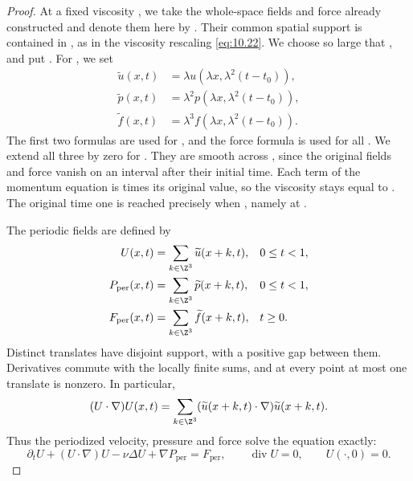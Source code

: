 \begin{proof}
At a fixed viscosity , we take the whole-space fields and force
already constructed and denote them here by . Their common
spatial support is contained in , as in the
viscosity rescaling \eqref{eq:10.22}. We choose  so large
that , and put
. For , we set
\[
\begin{aligned}
  \widetilde u(x,t)&=\lambda u(\lambda x,\lambda^2(t-t_0)),\\
  \widetilde p(x,t)&=\lambda^2p(\lambda x,\lambda^2(t-t_0)),\\
  \widetilde f(x,t)&=\lambda^3f(\lambda x,\lambda^2(t-t_0)).
\end{aligned}
\]
The first two formulas are used for , and the force formula is
used for all . We extend all three by zero for
. They are smooth across
, since the original fields and force vanish on an interval
after their initial time. Each term of the momentum equation is
 times its original value, so the viscosity stays equal
to . The original time one is reached precisely when
, namely at .

The periodic fields are defined by
\[
\begin{aligned}
  U(x,t)&=\sum_{k\in\Z^3}\widetilde u(x+k,t),&&0\leq t<1,\\
  P_{\mathrm{per}}(x,t)&=\sum_{k\in\Z^3}\widetilde p(x+k,t),&&0\leq t<1,\\
  F_{\mathrm{per}}(x,t)&=\sum_{k\in\Z^3}\widetilde f(x+k,t),&&t\geq0.
\end{aligned}
\]
Distinct translates have disjoint support, with a positive gap between them. Derivatives
commute with the locally finite sums, and at every point at most one translate is nonzero.
In particular,
\[
  (U\cdot\nabla)U(x,t)
  =\sum_{k\in\Z^3}(\widetilde u(x+k,t)\cdot\nabla)\widetilde u(x+k,t).
\]
Thus the periodized velocity, pressure and force solve the equation exactly:
\[
  \partial_tU+(U\cdot\nabla)U-\nu\Delta U+\nabla P_{\mathrm{per}}
  =F_{\mathrm{per}},\qquad
  \operatorname{div}U=0,\qquad U(\cdot,0)=0.
\]


\end{proof}
